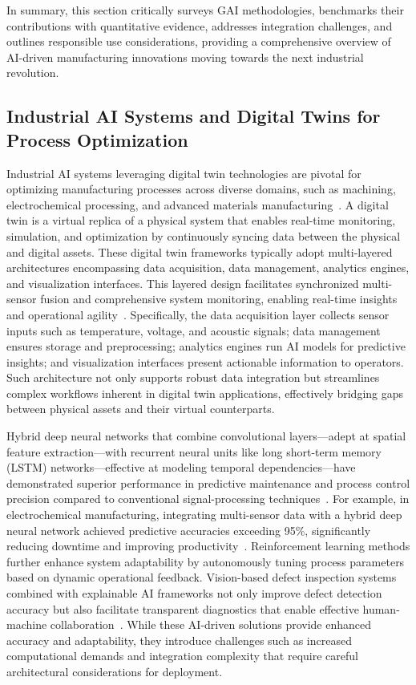 \documentclass[sigconf]{acmart}
\begin{document}
In summary, this section critically surveys GAI methodologies, benchmarks their contributions with quantitative evidence, addresses integration challenges, and outlines responsible use considerations, providing a comprehensive overview of AI-driven manufacturing innovations moving towards the next industrial revolution.

\subsection{Industrial AI Systems and Digital Twins for Process Optimization}

Industrial AI systems leveraging digital twin technologies are pivotal for optimizing manufacturing processes across diverse domains, such as machining, electrochemical processing, and advanced materials manufacturing~\cite{ref6,ref33}. A digital twin is a virtual replica of a physical system that enables real-time monitoring, simulation, and optimization by continuously syncing data between the physical and digital assets. These digital twin frameworks typically adopt multi-layered architectures encompassing data acquisition, data management, analytics engines, and visualization interfaces. This layered design facilitates synchronized multi-sensor fusion and comprehensive system monitoring, enabling real-time insights and operational agility~\cite{ref35,ref45}. Specifically, the data acquisition layer collects sensor inputs such as temperature, voltage, and acoustic signals; data management ensures storage and preprocessing; analytics engines run AI models for predictive insights; and visualization interfaces present actionable information to operators. Such architecture not only supports robust data integration but streamlines complex workflows inherent in digital twin applications, effectively bridging gaps between physical assets and their virtual counterparts.

Hybrid deep neural networks that combine convolutional layers—adept at spatial feature extraction—with recurrent neural units like long short-term memory (LSTM) networks—effective at modeling temporal dependencies—have demonstrated superior performance in predictive maintenance and process control precision compared to conventional signal-processing techniques~\cite{ref4,ref15,ref38}. For example, in electrochemical manufacturing, integrating multi-sensor data with a hybrid deep neural network achieved predictive accuracies exceeding 95\%, significantly reducing downtime and improving productivity~\cite{ref45}. Reinforcement learning methods further enhance system adaptability by autonomously tuning process parameters based on dynamic operational feedback. Vision-based defect inspection systems combined with explainable AI frameworks not only improve defect detection accuracy but also facilitate transparent diagnostics that enable effective human-machine collaboration~\cite{ref39}. While these AI-driven solutions provide enhanced accuracy and adaptability, they introduce challenges such as increased computational demands and integration complexity that require careful architectural considerations for deployment.
\end{document}
